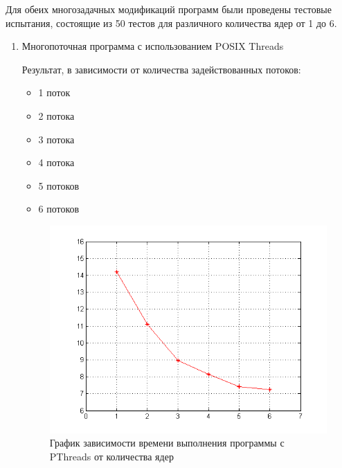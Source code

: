 Для обеих многозадачных модификаций программ были проведены тестовые испытания, состоящие из 50 тестов для различного количества ядер от 1 до 6.

\begin{enumerate}

\item Многопоточная программа с использованием POSIX Threads

Результат, в зависимости от количества задействованных потоков:

\begin{itemize}
	\item 1 поток
		
	\item 2 потока
		
	\item 3 потока
		
	\item 4 потока
		
	\item 5 потоков
		
	\item 6 потоков
		
\end{itemize}

\begin{figure}[H]
	\begin{center}
		\includegraphics[scale=0.7]{pic/posix.png}
		\caption{График зависимости времени выполнения программы с PThreads от количества ядер} 
		\label{pic:pic_name} %
	\end{center}
\end{figure}


\end{enumerate}
